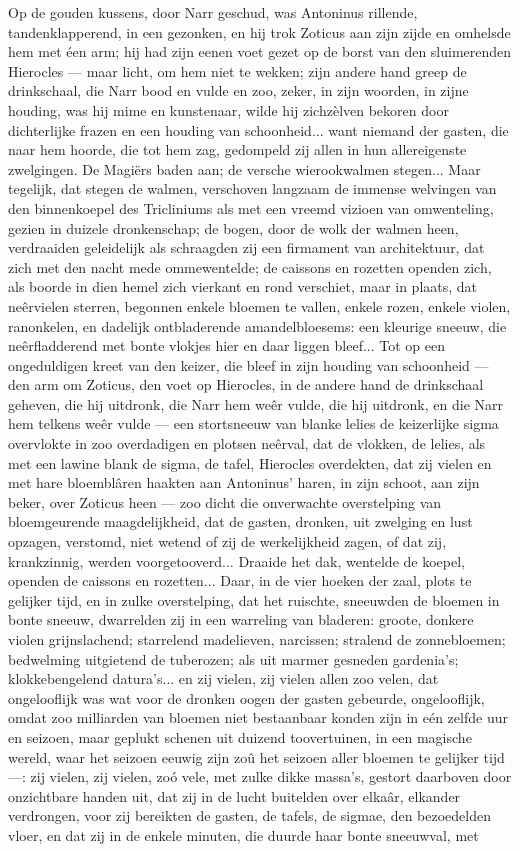 \documentclass[a4paper, 12pt, oneside, dutch]{article}
\begin{document}
Op de gouden kussens, door Narr geschud, was Antoninus rillende, tandenklapperend, in een gezonken, en hij trok Zoticus aan zijn zijde en omhelsde hem met éen arm; hij had zijn eenen voet gezet op de borst van den sluimerenden Hierocles --- maar licht, om hem niet te wekken; zijn andere hand greep de drinkschaal, die Narr bood en vulde en zoo, zeker, in zijn woorden, in zijne houding, was hij mime en kunstenaar, wilde hij zichzèlven bekoren door dichterlijke frazen en een houding van schoonheid... want niemand der gasten, die naar hem hoorde, die tot hem zag, gedompeld zij allen in hun allereigenste zwelgingen. De Magiërs baden aan; de versche wierookwalmen stegen... Maar tegelijk, dat stegen de walmen, verschoven langzaam de immense welvingen van den binnenkoepel des Tricliniums als met een vreemd vizioen van omwenteling, gezien in duizele dronkenschap; de bogen, door de wolk der walmen heen, verdraaiden geleidelijk als schraagden zij een firmament van architektuur, dat zich met den nacht mede ommewentelde; de caissons en rozetten openden zich, als boorde in dien hemel zich vierkant en rond verschiet, maar in plaats, dat neêrvielen sterren, begonnen enkele bloemen te vallen, enkele rozen, enkele violen, ranonkelen, en dadelijk ontbladerende amandelbloesems: een kleurige sneeuw, die neêrfladderend met bonte vlokjes hier en daar liggen bleef... Tot op een ongeduldigen kreet van den keizer, die bleef in zijn houding van schoonheid --- den arm om Zoticus, den voet op Hierocles, in de andere hand de drinkschaal geheven, die hij uitdronk, die Narr hem weêr vulde, die hij uitdronk, en die Narr hem telkens weêr vulde --- een stortsneeuw van blanke lelies de keizerlijke sigma overvlokte in zoo overdadigen en plotsen neêrval, dat de vlokken, de lelies, als met een lawine blank de sigma, de tafel, Hierocles overdekten, dat zij vielen en met hare bloemblâren haakten aan Antoninus' haren, in zijn schoot, aan zijn beker, over Zoticus heen --- zoo dicht die onverwachte overstelping van bloemgeurende maagdelijkheid, dat de gasten, dronken, uit zwelging en lust opzagen, verstomd, niet wetend of zij de werkelijkheid zagen, of dat zij, krankzinnig, werden voorgetooverd... Draaide het dak, wentelde de koepel, openden de caissons en rozetten... Daar, in de vier hoeken der zaal, plots te gelijker tijd, en in zulke overstelping, dat het ruischte, sneeuwden de bloemen in bonte sneeuw, dwarrelden zij in een warreling van bladeren: groote, donkere violen grijnslachend; starrelend madelieven, narcissen; stralend de zonnebloemen; bedwelming uitgietend de tuberozen; als uit marmer gesneden gardenia's; klokkebengelend datura's... en zij vielen, zij vielen allen zoo velen, dat ongelooflijk was wat voor de dronken oogen der gasten gebeurde, ongelooflijk, omdat zoo milliarden van bloemen niet bestaanbaar konden zijn in eén zelfde uur en seizoen, maar geplukt schenen uit duizend toovertuinen, in een magische wereld, waar het seizoen eeuwig zijn zoû het seizoen aller bloemen te gelijker tijd ---: zij vielen, zij vielen, zoó vele, met zulke dikke massa's, gestort daarboven door onzichtbare handen uit, dat zij in de lucht buitelden over elkaâr, elkander verdrongen, voor zij bereikten de gasten, de tafels, de sigmae, den bezoedelden vloer, en dat zij in de enkele minuten, die duurde haar bonte sneeuwval, met 
\end{document}
